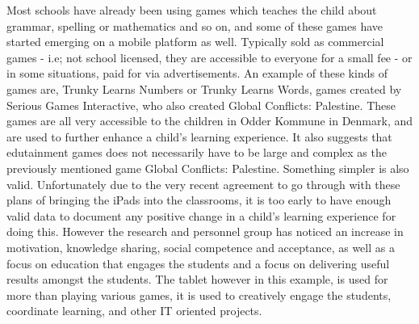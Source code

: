 Most schools have already been using games which teaches the child about grammar, spelling or mathematics and so on, and some of these games have started emerging on a mobile platform as well.
Typically sold as commercial games - i.e; not school licensed, they are accessible to everyone for a small fee - or in some situations, paid for via advertisements.
An example of these kinds of games are, Trunky Learns Numbers or Trunky Learns Words, games created by Serious Games Interactive, who also created Global Conflicts: Palestine.
These games are all very accessible to the children in Odder Kommune in Denmark, and are used to further enhance a child's learning experience.\cite{odderipad}
It also suggests that edutainment games does not necessarily have to be large and complex as the previously mentioned game Global Conflicts: Palestine.
Something simpler is also valid.
Unfortunately due to the very recent agreement to go through with these plans of bringing the iPads into the classrooms, it is too early to have enough valid data to document any positive change in a child's learning experience for doing this.
However the research and personnel group has noticed an increase in motivation, knowledge sharing, social competence and acceptance, as well as a focus on education that engages the students and a focus on delivering useful results amongst the students.\cite{odderipadpjece}
The tablet however in this example, is used for more than playing various games, it is used to creatively engage the students, coordinate learning, and other IT oriented projects.\cite{odderipadpjece}